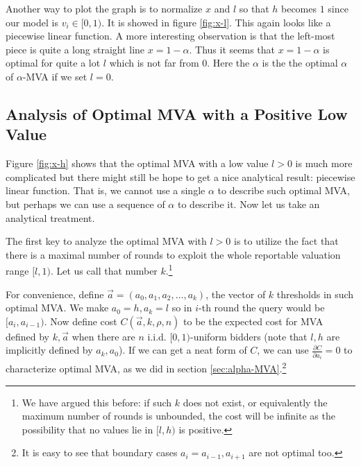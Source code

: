 Another way to plot the graph is to normalize $x$ and $l$ so that $h$ becomes
$1$ since our model is $v_i \in [0, 1)$. It is showed in figure \ref{fig:x-l}.
This again looks like a piecewise linear function.  A more interesting
observation is that the left-most piece is quite a long straight line $x =
1-\alpha$. Thus it seems that $x = 1-\alpha$ is optimal for quite a lot $l$ which is not
far from $0$. Here the $\alpha$ is the the optimal $\alpha$ of $\alpha$-MVA if
we set $l = 0$.

\subsection{Analysis of Optimal MVA with a Positive Low Value}\label{sec:general_analysis}

Figure \ref{fig:x-h} shows that the optimal MVA with a low value $l > 0$ is
much more complicated but there might still be hope to get a nice analytical
result: piecewise linear function. That is, we cannot use a single $\alpha$ to
describe such optimal MVA, but perhaps we can use a sequence of $\alpha$ to
describe it. Now let us take an analytical treatment.

The first key to analyze the optimal MVA with $l > 0$ is to utilize
the fact that there is a maximal number of rounds to exploit the whole
reportable valuation range $[l, 1)$. Let us call that
number $k$.\footnote{We have argued this before: if such $k$ does not exist, or equivalently
the maximum number of rounds is unbounded, the cost will be infinite as the possibility that no
values lie in $[l, h)$ is positive.}

For convenience, define $\vec a = (a_0, a_1, a_2, \ldots, a_k)$, the vector of
$k$ thresholds in such optimal MVA. We make $a_0 = h, a_k = l$ so in $i$-th
round the query would be $[a_i, a_{i-1})$. Now define cost $C(\vec a, k, \rho,
n)$ to be the expected cost for MVA defined by $k, \vec a$ when there are $n$
i.i.d.  $[0, 1)$-uniform bidders (note that $l, h$ are implicitly defined by
$a_k, a_0$). If we can get a neat form of $C$, we can use $\frac{\partial
C}{\partial a_i} = 0 $ to characterize optimal MVA, as we did in section
\ref{sec:alpha-MVA}.\footnote{It is easy to see that boundary cases $a_i = a_{i-1},
a_{i+1}$ are not optimal too.}

